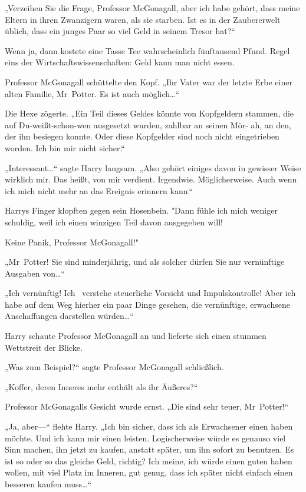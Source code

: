 {„Verzeihen Sie die Frage, Professor McGonagall, aber ich habe gehört, dass meine Eltern in ihren Zwanzigern waren, als sie starben. Ist es in der Zaubererwelt üblich, dass ein junges Paar so viel Geld in seinem Tresor hat?“

Wenn ja, dann kostete eine Tasse Tee wahrscheinlich fünftausend Pfund. Regel eins der Wirtschaftswissenschaften: Geld kann man nicht essen.

Professor McGonagall schüttelte den Kopf. „Ihr Vater war der letzte Erbe einer alten Familie, Mr~Potter. Es ist auch möglich…“

Die Hexe zögerte. „Ein Teil dieses Geldes könnte von Kopfgeldern stammen, die auf Du-weißt-schon-wen ausgesetzt wurden, zahlbar an seinen Mör- ah, an den, der ihn besiegen konnte. Oder diese Kopfgelder sind noch nicht eingetrieben worden. Ich bin mir nicht sicher.“

„Interessant…“ sagte Harry langsam. „Also gehört einiges davon in gewisser Weise wirklich mir. Das heißt, von mir verdient. Irgendwie. Möglicherweise. Auch wenn ich mich nicht mehr an das Ereignis erinnern kann.“

Harrys Finger klopften gegen sein Hosenbein. "Dann fühle ich mich weniger schuldig, weil ich einen winzigen Teil davon ausgegeben will!

Keine Panik, Professor McGonagall!"

„Mr~Potter! Sie sind minderjährig, und als solcher dürfen Sie nur vernünftige Ausgaben von…“

„Ich vernünftig! Ich ~verstehe steuerliche Vorsicht und Impulskontrolle! Aber ich habe auf dem Weg hierher ein paar Dinge gesehen, die vernünftige, erwachsene Anschaffungen darstellen würden…“

Harry schaute Professor McGonagall an und lieferte sich einen stummen Wettstreit der Blicke.

„Was zum Beispiel?“ sagte Professor McGonagall schließlich.

„Koffer, deren Inneres mehr enthält als ihr Äußeres?“

Professor McGonagalls Gesicht wurde ernst. „Die sind sehr teuer, Mr~Potter!“

„Ja, aber—“ flehte Harry. „Ich bin sicher, dass ich als Erwachsener einen haben möchte. Und ich kann mir einen leisten. Logischerweise würde es genauso viel Sinn machen, ihn jetzt zu kaufen, anstatt später, um ihn sofort zu benutzen. Es ist so oder so das gleiche Geld, richtig? Ich meine, ich würde einen guten haben wollen, mit viel Platz im Inneren, gut genug, dass ich später nicht einfach einen besseren kaufen muss…“

}
